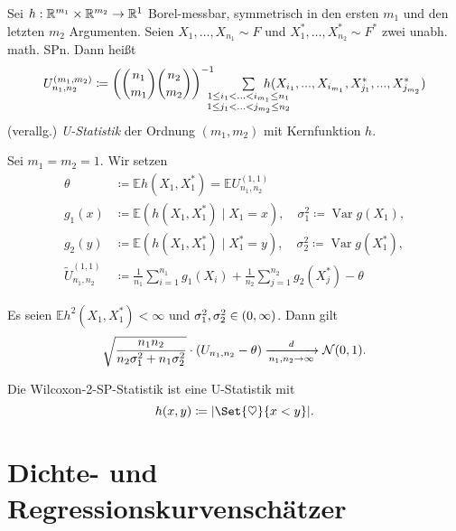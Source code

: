 \documentclass{cheat-sheet}
\newcommand{\E}{\mathbb{E}} %
\DeclareMathOperator{\var}{Var} %
\newcommand{\Normal}{\mathcal{N}} %
\begin{document}


\begin{defn}
  Sei $h : \mathbb{R}^{m_1} \times \mathbb{R}^{m_2} \to \mathbb{R}^1$ Borel-messbar, symmetrisch in den ersten $m_1$ und den letzten $m_2$ Argumenten.
  Seien $X_1, \ldots, X_{n_1} \sim F$ und $X_1^*, \ldots, X_{n_2}^* \sim F^*$ zwei unabh. math. SPn.
  Dann heißt
  \[
    U_{n_1, n_2}^{(m_1, m_2)} \coloneqq \left( \binom{n_1}{m_1} \binom{n_2}{m_2} \right)^{-1} \qquad
    \sum_{\mathclap{\substack{1 \leq i_1 < \ldots < i_{m_1} \leq n_1 \\ 1 \leq j_1 < \ldots < j_{m_2} \leq n_2}}} \enspace
    h(X_{i_1}, \nldots, X_{i_{m_1}}, X_{j_1}^*, \nldots, X_{j_{m_2}}^*)
  \]
  (verallg.) \emph{U-Statistik} der Ordnung $(m_1, m_2)$ mit Kernfunktion $h$.
\end{defn}

\begin{nota}
  Sei $m_1 = m_2 = 1$.
  Wir setzen
  \begin{align*}
    \theta & \coloneqq \E h(X_1, X_1^*) = \E U_{n_1, n_2}^{(1, 1)} \\
    g_1(x) & \coloneqq \E( h(X_1, X_1^*) \mid X_1 = x), \quad
    \sigma_1^2 \coloneqq \var g(X_1), \\
    g_2(y) & \coloneqq \E( h(X_1, X_1^*) \mid X_1^* = y), \quad
    \sigma_2^2 \coloneqq \var g(X_1^*), \\
    \tilde{U}_{n_1, n_2}^{(1,1)} & \coloneqq \tfrac{1}{n_1} \sum_{i=1}^{n_1} g_1(X_i) + \tfrac{1}{n_2} \sum_{j=1}^{n_2} g_2(X_j^*) - \theta
  \end{align*}
\end{nota}

\begin{lem}
  Es seien $\E h^2(X_1, X_1^*) < \infty$ und $\sigma_1^2, \sigma_2^2 \in \left( 0, \infty \right)$.
  Dann gilt
  \[
    \sqrt{\frac{n_1 n_2}{n_2 \sigma_1^2 + n_1 \sigma_2^2}} \cdot
    (U_{n_1, n_2} - \theta) \xra[n_1, n_2 \to \infty]{d} \Normal(0, 1).
  \]
\end{lem}

\begin{bsp}
  Die Wilcoxon-2-SP-Statistik ist eine U-Statistik mit
  \[ h(x, y) \coloneqq \abs{\Set{\heartsuit}{x < y}}. \]
\end{bsp}

\section{Dichte- und Regressionskurvenschätzer}
\end{document}
